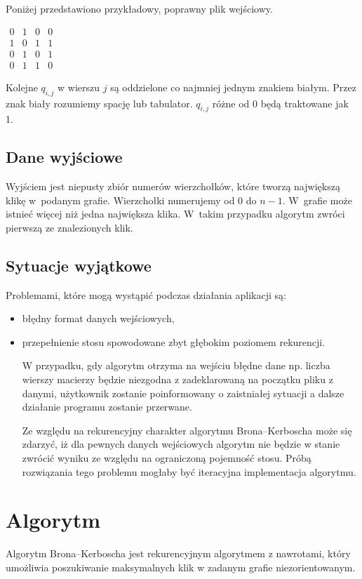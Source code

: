 \documentclass[12pt, a4paper]{article}
\begin{document}
Poniżej przedstawiono przykładowy, poprawny plik wejściowy.

\bigskip

$ 
\begin{array}{cccc}
0 & 1 & 0 & 0 \\
1 & 0 & 1 & 1 \\
0 & 1 & 0 & 1 \\
0 & 1 & 1 & 0
\end{array}
$
\bigskip

Kolejne $q_{i,j}$ w wierszu $j$ są oddzielone co najmniej jednym znakiem białym. 
Przez znak biały rozumiemy spację lub tabulator. $q_{i,j}$ różne od 0 będą traktowane jak 1.
\subsection{Dane wyjściowe}
Wyjściem jest niepusty zbiór numerów wierzchołków, które tworzą największą klikę w~podanym grafie. 
Wierzchołki numerujemy od 0 do $n-1$. W~grafie może istnieć więcej niż jedna największa klika.
W~takim przypadku algorytm zwróci pierwszą ze znalezionych klik.
\subsection{Sytuacje wyjątkowe}
Problemami, które mogą wystąpić podczas działania aplikacji są:
\begin{itemize}
	\item błędny format danych wejściowych,
	\item przepełnienie stosu spowodowane zbyt głębokim poziomem rekurencji.

\bigskip
W przypadku, gdy algorytm otrzyma na wejściu błędne dane np. liczba wierszy macierzy będzie niezgodna z zadeklarowaną na początku pliku z danymi, użytkownik zostanie poinformowany o zaistniałej sytuacji a dalsze działanie programu zostanie przerwane.

\bigskip
Ze względu na rekurencyjny charakter algorytmu Brona--Kerboscha może się zdarzyć, iż dla pewnych danych wejściowych algorytm nie będzie w stanie zwrócić wyniku ze względu na ograniczoną pojemność stosu.
Próbą rozwiązania tego problemu mogłaby być iteracyjna implementacja algorytmu.

\end{itemize}
\section{Algorytm}
\label{bron_kerbosch}
Algorytm Brona--Kerboscha jest rekurencyjnym algorytmem z nawrotami, który umożliwia poszukiwanie maksymalnych klik w zadanym grafie niezorientowanym.
\end{document}
